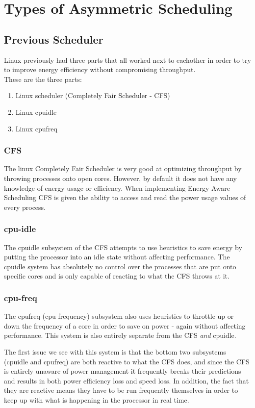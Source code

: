 \section{Types of Asymmetric Scheduling}
\subsection{Previous Scheduler}
Linux previously had three parts that all worked next to eachother in order to try to improve energy efficiency without compromising throughput.\\
These are the three parts:
\begin{enumerate} 
    \item Linux scheduler (Completely Fair Scheduler - CFS)
    \item Linux cpuidle
    \item Linux cpufreq
\end{enumerate}

\subsubsection{CFS}
The linux Completely Fair Scheduler is very good at optimizing throughput by throwing processes onto open cores. However, by default it does not have any knowledge of energy usage or efficiency. When implementing Energy Aware Scheduling CFS is given the ability to access and read the power usage values of every process.\cite{EAS2015}

\subsubsection{cpu-idle}
The cpuidle subsystem of the CFS attempts to use heuristics to save energy by putting the processor into an idle state without affecting performance. The cpuidle system has absolutely no control over the processes that are put onto specific cores and is only capable of reacting to what the CFS throws at it. \cite{EAS2015}

\subsubsection{cpu-freq}
The cpufreq (cpu frequency) subsystem also uses heuristics to throttle up or down the frequency of a core in order to save on power - again without affecting performance. This system is also entirely separate from the CFS \textit{and} cpuidle. \cite{EAS2015}

The first issue we see with this system is that the bottom two subsystems (cpuidle and cpufreq) are both reactive to what the CFS does, and since the CFS is entirely unaware of power management it frequently breaks their predictions and results in both power efficiency loss and speed loss. In addition, the fact that they are reactive means they have to be run frequently themselves in order to keep up with what is happening in the processor in real time. \cite{EAS2015}


